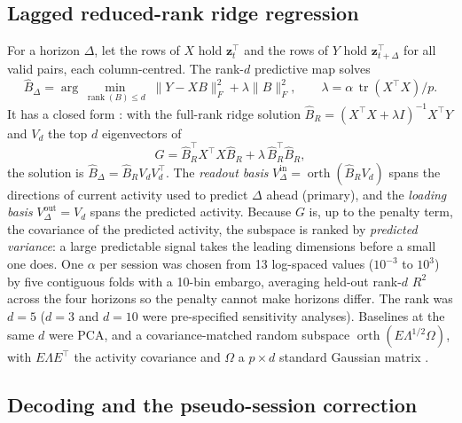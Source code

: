 \documentclass{article}
\newcommand{\tr}{\operatorname{tr}}
\newcommand{\orth}{\operatorname{orth}}
\newcommand{\rank}{\operatorname{rank}}
\newcommand{\bm}[1]{\boldsymbol{#1}}
\begin{document}
\subsection{Lagged reduced-rank ridge regression}
\label{sec:rrr}

For a horizon $\Delta$, let the rows of $X$ hold $\bm z_t^\top$ and the rows of $Y$ hold $\bm z_{t+\Delta}^\top$ for
all valid pairs, each column-centred. The rank-$d$ predictive map solves
\begin{equation}
  \hat B_\Delta = \arg\min_{\rank(B)\le d} \; \lVert Y - XB \rVert_F^2 + \lambda \lVert B \rVert_F^2 ,
  \qquad \lambda = \alpha\, \tr(X^\top X)/p .
  \label{eq:rrr}
\end{equation}
It has a closed form \citep{mukherjee2011}: with the full-rank ridge solution
$\hat B_R = (X^\top X + \lambda I)^{-1} X^\top Y$ and $V_d$ the top $d$ eigenvectors of
\begin{equation}
  G = \hat B_R^\top X^\top X \hat B_R + \lambda\, \hat B_R^\top \hat B_R ,
  \label{eq:gram}
\end{equation}
the solution is $\hat B_\Delta = \hat B_R V_d V_d^\top$. The \emph{readout basis}
$V^{\mathrm{in}}_\Delta = \orth(\hat B_R V_d)$ spans the directions of current activity used to predict $\Delta$
ahead (primary), and the \emph{loading basis} $V^{\mathrm{out}}_\Delta = V_d$ spans the predicted activity. Because
$G$ is, up to the penalty term, the covariance of the predicted activity, the subspace is ranked by
\emph{predicted variance}: a large predictable signal takes the leading dimensions before a small one does. One
$\alpha$ per session was chosen from 13 log-spaced values ($10^{-3}$ to $10^{3}$) by five contiguous folds with a
10-bin embargo, averaging held-out rank-$d$ $R^2$ across the four horizons so the penalty cannot make horizons differ.
The rank was $d=5$ ($d=3$ and $d=10$ were pre-specified sensitivity analyses). Baselines at the same $d$ were PCA,
and a covariance-matched random subspace $\orth(E\Lambda^{1/2}\Omega)$, with $E\Lambda E^\top$ the activity covariance
and $\Omega$ a $p \times d$ standard Gaussian matrix \citep{elsayed2016}.

\subsection{Decoding and the pseudo-session correction}
\label{sec:decode}
\end{document}
